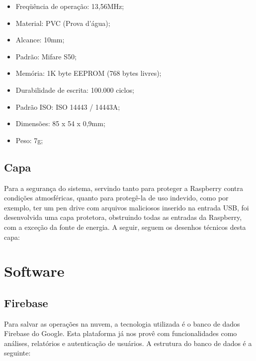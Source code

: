 \documentclass[
	12pt,				%
	openright,			%
	oneside,			%
	a4paper,			%
	english,			%
	french,				%
	spanish,			%
	brazil				%
	]{abntex2}
\begin{document}
\begin{itemize}
	\item Freqüência de operação: 13,56MHz;
	\item Material: PVC (Prova d’água);
	\item Alcance: 10mm;
	\item Padrão: Mifare S50;
	\item Memória: 1K byte EEPROM (768 bytes livres);
	\item Durabilidade de escrita: 100.000 ciclos;
	\item Padrão ISO: ISO 14443 / 14443A;
	\item Dimensões: 85 x 54 x 0,9mm;
	\item Peso: 7g;
\end{itemize}


\subsection{Capa}

Para a segurança do sistema, servindo tanto para proteger a Raspberry contra condições atmosféricas, quanto para protegê-la de uso indevido, como por exemplo, ter um pen drive com arquivos maliciosos inserido na entrada USB, foi desenvolvida uma capa protetora, obstruindo todas as entradas da Raspberry, com a exceção da fonte de energia. A seguir, seguem os desenhos técnicos desta capa:


%


\section{Software}

\subsection{Firebase}

Para salvar as operações na nuvem, a tecnologia utilizada é o banco de dados Firebase do Google. Esta plataforma já nos provê com funcionalidades como análises, relatórios e autenticação de usuários. A estrutura do banco de dados é a seguinte:
\end{document}
